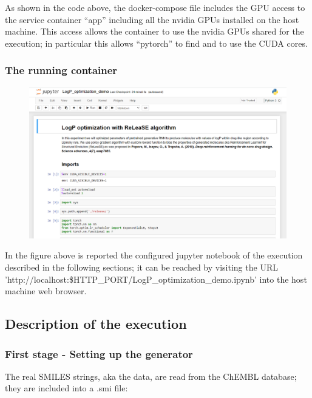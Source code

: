 \documentclass[a4paper]{article}
\begin{document}
As shown in the code above, the docker-compose file includes the GPU access \cite{gpu-support} to the service container “app” including all the nvidia GPUs installed on the host machine. This access allows the container to use the nvidia GPUs shared for the execution; in particular this allows “pytorch” to find and to use the CUDA cores.

\subsubsection{The running container}\label{sec:The running container}

\begin{figure}[htbp]
    \centering
        \includegraphics[width=\textwidth]{logp-optimization.png}
    \label{fig:logp-optimization}
\end{figure}

In the figure above is reported the configured jupyter notebook of the execution described in the following sections; it can be reached by visiting the URL 'http://localhost:\${HTTP\_PORT}/LogP\_optimization\_demo.ipynb' into the host machine web browser.

\subsection{Description of the execution}\label{sec:Description of the execution}

\subsubsection{First stage - Setting up the generator}\label{sec:First stage - Setting up the generator}

The real SMILES strings, aka the data, are read from the ChEMBL database; they are included into a .smi file:
\end{document}
